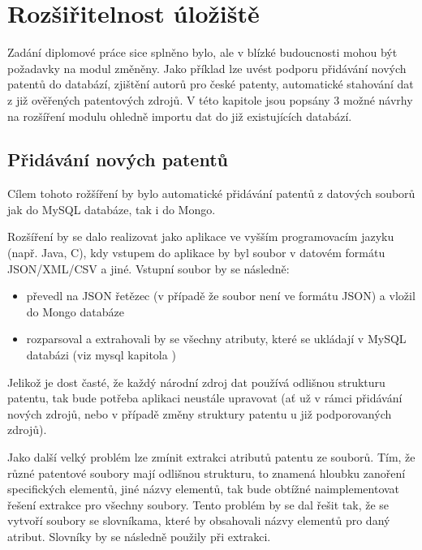 \chapter{Rozšiřitelnost úložiště}
Zadání diplomové práce sice splněno bylo, ale v blízké budoucnosti mohou být požadavky na modul změněny. Jako příklad lze uvést podporu přidávání nových patentů do databází, zjištění autorů pro české patenty, automatické stahování dat z již ověřených patentových zdrojů. V této kapitole jsou popsány 3 možné návrhy na rozšíření modulu ohledně importu dat do již existujících databází.

\section{Přidávání nových patentů} \label{sec:new_patenty}
Cílem tohoto rožšíření by bylo automatické přidávání patentů z datových souborů jak do MySQL databáze, tak i do Mongo.

Rozšíření by se dalo realizovat jako aplikace ve vyšším programovacím jazyku (např. Java, C), kdy vstupem do aplikace by byl soubor v datovém formátu JSON/XML/CSV a jiné. Vstupní soubor by se následně:
\begin{itemize}
\item převedl na JSON řetězec (v případě že soubor není ve formátu JSON) a vložil do Mongo databáze
\item rozparsoval a extrahovali by se všechny atributy, které se ukládají v MySQL databázi (viz mysql kapitola )
\end{itemize}

Jelikož je dost časté, že každý národní zdroj dat používá odlišnou strukturu patentu, tak bude potřeba aplikaci neustále upravovat (ať už v rámci přidávání nových zdrojů, nebo v případě změny struktury patentu u již podporovaných zdrojů).

Jako další velký problém lze zmínit extrakci atributů patentu ze souborů. Tím, že různé patentové soubory mají odlišnou strukturu, to znamená hloubku zanoření specifických elementů, jiné názvy elementů, tak bude obtížné naimplementovat řešení extrakce pro všechny soubory. Tento problém by se dal řešit tak, že se vytvoří soubory se slovníkama, které by obsahovali názvy elementů pro daný atribut. Slovníky by se následně použily při extrakci.

